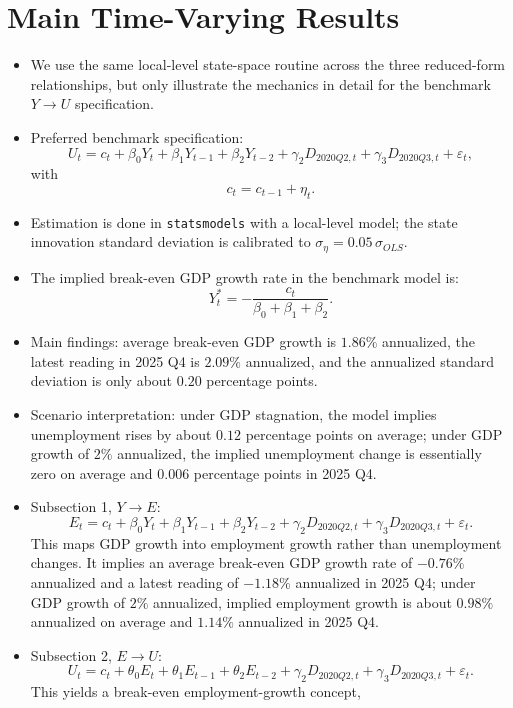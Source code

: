 \documentclass[11pt]{article}
\begin{document}
\section{Main Time-Varying Results}
\begin{itemize}
    \item We use the same local-level state-space routine across the three reduced-form relationships, but only illustrate the mechanics in detail for the benchmark \(Y \rightarrow U\) specification.
    \item Preferred benchmark specification:
    \[
    U_t = c_t + \beta_0 Y_t + \beta_1 Y_{t-1} + \beta_2 Y_{t-2} + \gamma_2 D_{2020Q2,t} + \gamma_3 D_{2020Q3,t} + \varepsilon_t,
    \]
    with
    \[
    c_t = c_{t-1} + \eta_t.
    \]
    \item Estimation is done in \texttt{statsmodels} with a local-level model; the state innovation standard deviation is calibrated to \(\sigma_{\eta}=0.05\,\sigma_{OLS}\).
    \item The implied break-even GDP growth rate in the benchmark model is:
    \[
    Y_t^\ast = -\frac{c_t}{\beta_0+\beta_1+\beta_2}.
    \]
    \item Main findings:
    average break-even GDP growth is \(1.86\%\) annualized,
    the latest reading in 2025 Q4 is \(2.09\%\) annualized,
    and the annualized standard deviation is only about \(0.20\) percentage points.
    \item Scenario interpretation:
    under GDP stagnation, the model implies unemployment rises by about \(0.12\) percentage points on average;
    under GDP growth of \(2\%\) annualized, the implied unemployment change is essentially zero on average and \(0.006\) percentage points in 2025 Q4.
    \item Subsection 1, \(Y \rightarrow E\):
    \[
    E_t = c_t + \beta_0 Y_t + \beta_1 Y_{t-1} + \beta_2 Y_{t-2} + \gamma_2 D_{2020Q2,t} + \gamma_3 D_{2020Q3,t} + \varepsilon_t.
    \]
    This maps GDP growth into employment growth rather than unemployment changes.
    It implies an average break-even GDP growth rate of \(-0.76\%\) annualized and a latest reading of \(-1.18\%\) annualized in 2025 Q4; under GDP growth of \(2\%\) annualized, implied employment growth is about \(0.98\%\) annualized on average and \(1.14\%\) annualized in 2025 Q4.
    \item Subsection 2, \(E \rightarrow U\):
    \[
    U_t = c_t + \theta_0 E_t + \theta_1 E_{t-1} + \theta_2 E_{t-2} + \gamma_2 D_{2020Q2,t} + \gamma_3 D_{2020Q3,t} + \varepsilon_t.
    \]
    This yields a break-even employment-growth concept,

\end{itemize}
\end{document}
